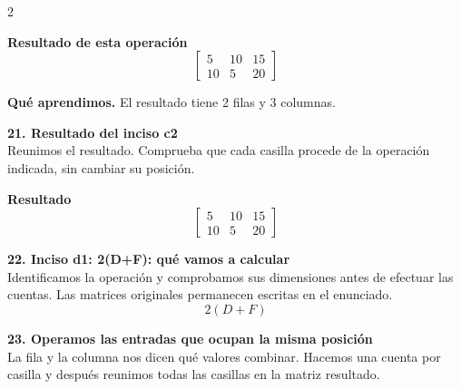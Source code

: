 \documentclass[11pt,a4paper,landscape]{article}
\begin{document}
\begin{multicols*}{2}
\begin{minipage}{\linewidth}
\par\smallskip \textbf{Resultado de esta operación}\[\begin{bmatrix}5 & 10 & 15\\10 & 5 & 20\end{bmatrix}\]
\par\smallskip\textbf{Qué aprendimos.} El resultado tiene 2 filas y 3 columnas.
\end{minipage}\par\medskip
\noindent\begin{minipage}{\linewidth}\textbf{21. Resultado del inciso c2}\\[2pt]Reunimos el resultado. Comprueba que cada casilla procede de la operación indicada, sin cambiar su posición.
\par\smallskip \textbf{Resultado}\[\begin{bmatrix}5 & 10 & 15\\10 & 5 & 20\end{bmatrix}\]
\end{minipage}\par\medskip
\noindent\begin{minipage}{\linewidth}\textbf{22. Inciso d1: 2(D+F): qué vamos a calcular}\\[2pt]Identificamos la operación y comprobamos sus dimensiones antes de efectuar las cuentas. Las matrices originales permanecen escritas en el enunciado.
\[2(D+F)\]
\end{minipage}\par\medskip
\noindent\begin{minipage}{\linewidth}\textbf{23. Operamos las entradas que ocupan la misma posición}\\[2pt]La fila y la columna nos dicen qué valores combinar. Hacemos una cuenta por casilla y después reunimos todas las casillas en la matriz resultado.
\par{}\par\smallskip

\end{minipage}
\end{multicols*}
\end{document}
